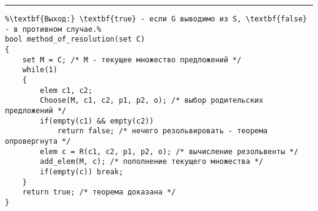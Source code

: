 \documentclass{article}
\begin{document}
\vspace{5pt} \hrule
\begin{lstlisting}[caption={Метод резолюций}, label=p_176, escapechar=\%]
%\noindent\textbf{Вход:} множество предложений C, полученных из множества формул S и формулы $\neg G$.\\%
%\textbf{Выход:} \textbf{true} - если G выводимо из S, \textbf{false} - в противном случае.%
bool method_of_resolution(set C)
{
	set M = C; /* M - текущее множество предложений */
	while(1)
	{
		elem c1, c2;
		Choose(M, c1, c2, p1, p2, o); /* выбор родительских предложений */
		if(empty(c1) && empty(c2))
			return false; /* нечего резольвировать - теорема опровергнута */
		elem c = R(c1, c2, p1, p2, o); /* вычисление резольвенты */
		add_elem(M, c); /* пополнение текущего множества */
		if(empty(c)) break;
	}
	return true; /* теорема доказана */
}
\end{lstlisting}
\end{document}
